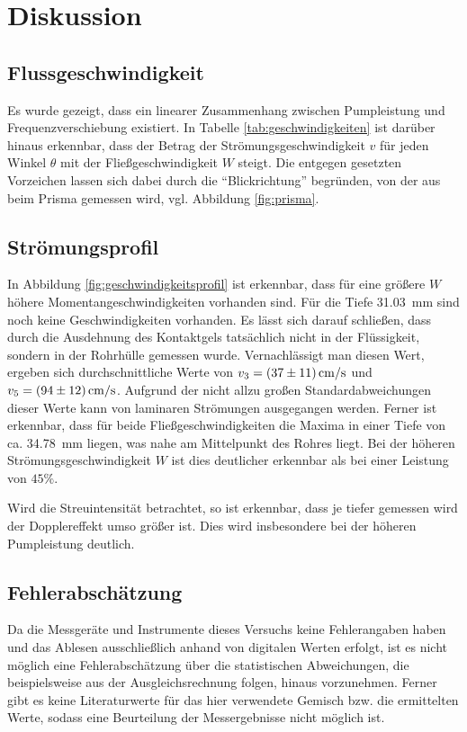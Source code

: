 \section{Diskussion}

\subsection{Flussgeschwindigkeit}
Es wurde gezeigt, dass ein linearer Zusammenhang zwischen Pumpleistung und Frequenzverschiebung existiert.
In Tabelle \ref{tab:geschwindigkeiten} ist darüber hinaus erkennbar, dass der Betrag der Strömungsgeschwindigkeit $v$ 
für jeden Winkel $\theta$ mit der Fließgeschwindigkeit $W$ steigt.
Die entgegen gesetzten Vorzeichen lassen sich dabei durch die \enquote{Blickrichtung} begründen, von der aus beim Prisma gemessen wird,
vgl. Abbildung \ref{fig:prisma}.


\subsection{Strömungsprofil}
In Abbildung \ref{fig:geschwindigkeitsprofil} ist erkennbar, dass für eine größere $W$ höhere Momentangeschwindigkeiten vorhanden sind.
Für die Tiefe \qty{31.03}{\milli\meter} sind noch keine Geschwindigkeiten vorhanden.
Es lässt sich darauf schließen, dass durch die Ausdehnung des Kontaktgels tatsächlich nicht in der Flüssigkeit, sondern in der Rohrhülle gemessen wurde.
Vernachlässigt man diesen Wert, ergeben sich durchschnittliche Werte von $v_3 = \qty{37+-11}{\centi\meter\per\second}$
und $v_5 = \qty{94+-12}{\centi\meter\per\second}$.
Aufgrund der nicht allzu großen Standardabweichungen dieser Werte kann von laminaren Strömungen ausgegangen werden.
Ferner ist erkennbar, dass für beide Fließgeschwindigkeiten die Maxima in einer Tiefe von ca. \qty{34.78}{\milli\meter} liegen, 
was nahe am Mittelpunkt des Rohres liegt.
Bei der höheren Strömungsgeschwindigkeit $W$ ist dies deutlicher erkennbar als bei einer Leistung von $45 \%$.

\noindent
Wird die Streuintensität betrachtet, so ist erkennbar, dass je tiefer gemessen wird der Dopplereffekt umso größer ist.
Dies wird insbesondere bei der höheren Pumpleistung deutlich.

\subsection{Fehlerabschätzung}
Da die Messgeräte und Instrumente dieses Versuchs keine Fehlerangaben haben und das Ablesen ausschließlich anhand von digitalen Werten
erfolgt,
ist es nicht möglich eine Fehlerabschätzung über die statistischen Abweichungen, die beispielsweise aus der Ausgleichsrechnung folgen,
hinaus vorzunehmen.
Ferner gibt es keine Literaturwerte für das hier verwendete Gemisch bzw. die ermittelten Werte, sodass eine Beurteilung der
Messergebnisse nicht möglich ist.